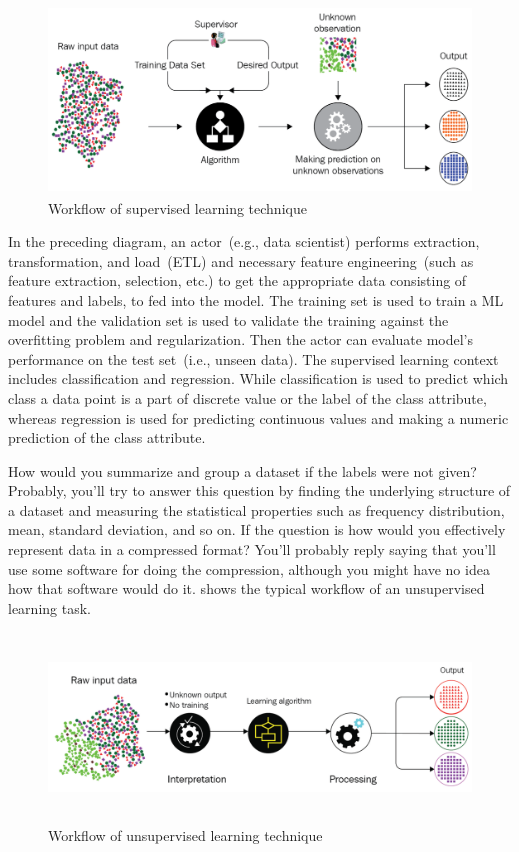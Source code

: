 \begin{figure}[h]
	\centering
	\includegraphics[width=0.9\linewidth,height=50mm]{images/sup.png}
	\caption{Workflow of supervised learning technique~\cite{karimScalaML2019}} 
	\label{fig:ml_pipeline_sup}
\end{figure}

\hspace*{3.5mm} In the preceding diagram, an actor~(e.g., data scientist) performs extraction, transformation, and load~(ETL) and necessary feature engineering~(such as feature extraction, selection, etc.) to get the appropriate data consisting of features and labels, to fed into the model. The training set is used to train a ML model and the validation set is used to validate the training against the overfitting problem and regularization. Then the actor can evaluate model's performance on the test set~(i.e., unseen data). The supervised learning context includes classification and regression. While classification is used to predict which class a data point is a part of discrete value or the label of the class attribute, whereas regression is used for predicting continuous values and making a numeric prediction of the class attribute.

\hspace*{3.5mm} How would you summarize and group a dataset if the labels were not given? Probably, you'll try to answer this question by finding the underlying structure of a dataset and measuring the statistical properties such as frequency distribution, mean, standard deviation, and so on. If the question is how would you effectively represent data in a compressed format? You'll probably reply saying that you'll use some software for doing the compression, although you might have no idea how that software would do it.  shows the typical workflow of an unsupervised learning task. 

\begin{figure}[h]
	\centering
	\includegraphics[width=0.9\linewidth,height=50mm]{images/unsup.png}
	\caption{Workflow of unsupervised learning technique~\cite{karimScalaML2019}} 
	\label{fig:ml_pipeline_unsup}
\end{figure}

